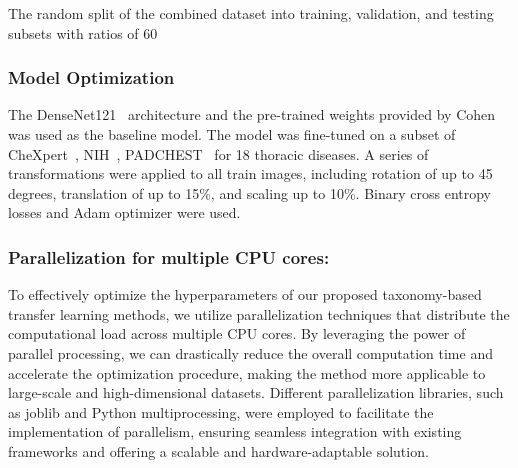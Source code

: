 \documentclass[review,1p,times,numbers]{elsarticle}
\begin{document}
The random split of the combined dataset into training, validation, and testing subsets with ratios of 60%
\subsubsection{Model Optimization}
The DenseNet121~\cite{huang_Densely_2017} architecture and the pre-trained weights provided by Cohen~\cite{cohen_TorchXRayVision_2022} was used as the baseline model. The model was fine-tuned on a subset of CheXpert~\cite{irvin_CheXpert_2019}, NIH~\cite{wang_ChestXRay8_2017}, PADCHEST~\cite{bustos_Padchest_2020} for 18 thoracic diseases. A series of transformations were applied to all train images, including rotation of up to 45 degrees, translation of up to 15\%, and scaling up to 10\%. Binary cross entropy losses and Adam optimizer were used.

\subsubsection{Parallelization for multiple CPU cores:}
To effectively optimize the hyperparameters of our proposed taxonomy-based transfer learning methods, we utilize parallelization techniques that distribute the computational load across multiple CPU cores. By leveraging the power of parallel processing, we can drastically reduce the overall computation time and accelerate the optimization procedure, making the method more applicable to large-scale and high-dimensional datasets. Different parallelization libraries, such as joblib and Python multiprocessing, were employed to facilitate the implementation of parallelism, ensuring seamless integration with existing frameworks and offering a scalable and hardware-adaptable solution.
\end{document}

